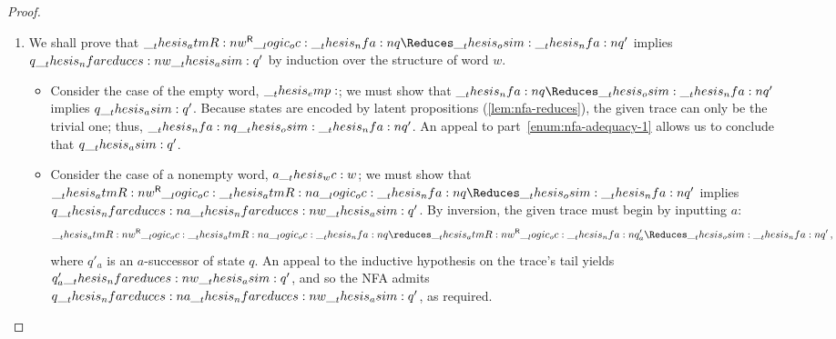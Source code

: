 \begin{proof}
\begin{enumerate}[parsep=0em, listparindent=\parindent]
\begin{enumerate}

    \item
      We shall prove that $\rev{\atmR{w}} \oc \nfa{q} \Reduces\osim \nfa{q}'$ implies $q \nfareduces[w]\asim q'$ by induction over the structure of word $w$.
      \begin{itemize}
      \item Consider the case of the empty word, $\__thesis_emp:$; we must show that $\nfa{q} \Reduces\osim \nfa{q}'$ implies $q \__thesis_asim: q'$.
        Because states are encoded by latent propositions (\cref{lem:nfa-reduces}), the given trace can only be the trivial one; thus, $\__thesis_nfa:n {q} \__thesis_osim: \__thesis_nfa:n {q}'$.
        An appeal to part~\ref{enum:nfa-adequacy-1} allows us to conclude that $q \__thesis_asim: q'$.
      \item Consider the case of a nonempty word, $a \wc w$; we must show that $\rev{\atmR{w}} \oc \atmR{a} \oc \nfa{q} \Reduces\osim \nfa{q}'$ implies $q \nfareduces[a]\nfareduces[w]\asim q'$.
        By inversion, the given trace must begin by inputting $a$:
        \begin{equation*}
          \rev{\atmR{w}} \oc \atmR{a} \oc \nfa{q} \reduces \rev{\atmR{w}} \oc \nfa{q}'_a \Reduces\osim \nfa{q}'
          \,,
        \end{equation*}
        where $q'_a$ is an $a$-successor of state $q$.
        An appeal to the inductive hypothesis on the trace's tail yields $q'_a \nfareduces[w]\asim q'$, and so the \ac{NFA} admits $q \nfareduces[a]\nfareduces[w]\asim q'$, as required.
      \end{itemize}
    \end{enumerate}


\end{enumerate}
\end{proof}
